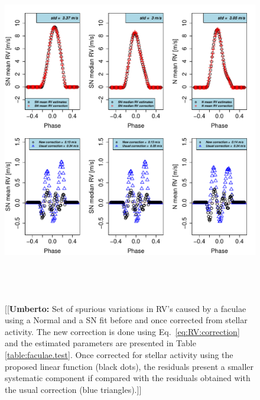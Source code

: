 \documentclass{aa}
\newcommand{\umberto}[1]{{\color{green}[[\textbf{Umberto: }#1]]}}
\begin{document}
\begin{figure}[htbp]
\begin{center}
\includegraphics[height = 6in]{FACULAE_NEW_CORRECTION_[3]CorrectionActivity_RadialVelocity_vs_time.pdf} 
   \caption{\umberto{Set of spurious variations in RV's caused by a faculae using a Normal and a SN fit before and once corrected from stellar activity. The new correction is done using Eq.~\ref{eq:RV:correction} and the estimated parameters are presented in Table \ref{table:faculae.test}. Once corrected for stellar activity using the proposed linear function (black dots), the residuals present a smaller systematic component if compared with the residuals obtained with the usual correction (blue triangles).}}
    \label{fig:faculae.correction}
\end{center}
\end{figure}
\end{document}

